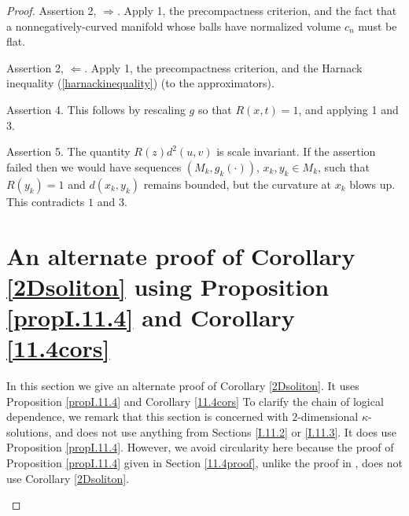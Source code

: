 \begin{proof}
\bigskip
Assertion 2, $\Longrightarrow$.  Apply 1,
the precompactness criterion, and the fact
that a nonnegatively-curved manifold whose balls
have normalized volume $c_n$ must be flat.

\bigskip
Assertion 2, $\Longleftarrow$. Apply 1, the precompactness criterion,
and the Harnack inequality (\ref{harnackinequality}) (to the approximators).

\bigskip
Assertion 4.  This follows by rescaling $g$ so that $R(x,t)=1$, and
applying 1 and 3.

\bigskip
Assertion 5.  The quantity $R(z)d^2(u,v)$ is scale invariant.
If the assertion failed then  we would have sequences $(M_k,g_k(\cdot))$,
$x_k,y_k\in M_k$, such that $R(y_k)=1$ and
$d(x_k,y_k)$ remains bounded, but the curvature at $x_k$ blows up.
This contradicts $1$ and $3$.




\section{An alternate proof of Corollary \ref{2Dsoliton}
using Proposition \ref{propI.11.4} and Corollary \ref{11.4cors}}
\label{altpf11.3}

In this section we give an alternate proof of Corollary \ref{2Dsoliton}.
It uses Proposition \ref{propI.11.4} and Corollary \ref{11.4cors}
To clarify the chain of logical dependence, we remark that
this section is concerned with $2$-dimensional $\kappa$-solutions,
and does not use anything from Sections \ref{I.11.2} or \ref{I.11.3}.   It does use
Proposition \ref{propI.11.4}.  However, we avoid circularity here because the proof
of Proposition \ref{propI.11.4} given in Section \ref{11.4proof}, unlike the
proof in \cite{Perelman}, does not use Corollary \ref{2Dsoliton}.

\begin{lemma}
  \label{lem:kl-alternate-proof-corollary-2dsoliton-using-proposition-propi-11-4-corolla-existence-kappa-solutions}


\end{lemma}
\end{proof}
